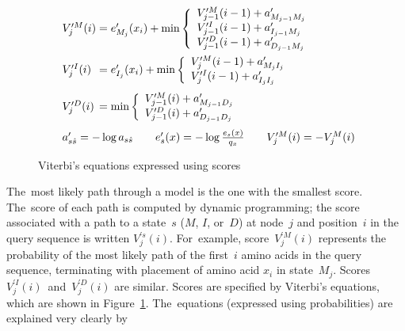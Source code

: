 \documentclass[]{jfp1}
\newcommand\figref[1]{Figure~\ref{fig:#1}}
\newcommand\figlabel[1]{\label{fig:#1}}
\begin{document}
\begin{figure}
\[
\begin{array}{l@{}c@{}l@{}}
V_{j}^{\prime M}(i) &{}={}& e^{\prime}_{M_{j}}(x_{i}) + \min \left\{
  \begin{array}{l@{}c@{}l}
  \vsum{V_{j-1}^{\prime M}(i - 1)} {a^{\prime}_{M_{j-1}M_{j}}}\\
  \vsum{V_{j-1}^{\prime I}(i - 1)} {a^{\prime}_{I_{j-1}M_{j}}}\\
  \vsum{V_{j-1}^{\prime D}(i - 1)} {a^{\prime}_{D_{j-1}M_{j}}}\\
  \end{array} \right.\\[\goo]
V_{j}^{\prime I}(i) &=& e^{\prime}_{I_{j}}(x_{i}) + \min \left\{
  \begin{array}{l@{}c@{}l}
  \vsum{V_{j}^{\prime M}(i - 1)} {a^{\prime}_{M_{j}I_{j}}}\\
  \vsum{V_{j}^{\prime I}(i - 1)} {a^{\prime}_{I_{j}I_{j}}}\\
  \end{array} \right.\\[\gum]
V_{j}^{\prime D}(i) &=& \min \left\{
  \begin{array}{l@{}c@{}l}
  \vsum{V_{j-1}^{\prime M}(i)} {a^{\prime}_{M_{j-1}D_{j}}}\\
  \vsum{V_{j-1}^{\prime D}(i)} {a^{\prime}_{D_{j-1}D_{j}}}\\
  \end{array} \right.\\[\gum]
%
\multicolumn3{l@{}}{%
  a'_{s \hat{s}} = - \log a_{s \hat{s}} 
\qquad
  e^{\prime}_{s}(x) = - \log\frac{e_{s}(x)}{q_{x}}
\qquad
  V_j^{\prime M}(i) = - V_j^{M}(i)
}
\\
\end{array}
\]

\caption{Viterbi's equations expressed using scores}
\figlabel{viterbi-transformed}
\end{figure}




The~most likely path through a model is the one with the
smallest score.
The~score of each path is computed by dynamic programming; the score associated with
a path to a state~$s$ ($M$, $I$, or~$D$) at node~$j$ and position~$i$ in
the query sequence is written $V_j^{\prime s}(i)$.
For~example, 
score~$V_j^{\prime M}(i)$ represents the probability of the most
likely path of the first~$i$ amino acids in the query sequence,
terminating with placement of amino acid $x_i$ in state~$M_j$.
Scores $V_j^{\prime I}(i)$~and~$V_j^{\prime D}(i)$ are similar.
Scores are specified by Viterbi's equations, which are shown
in \figref{viterbi-transformed}. 
The~equations (expressed using probabilities) are explained very clearly by
\citet[Chapter~5]{Durbin:1998wz}
\end{document}
